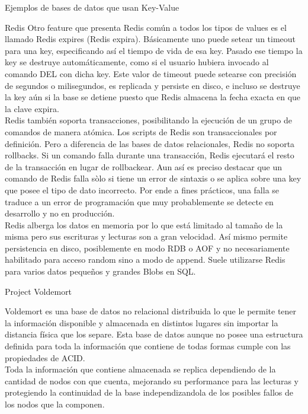 \begin{section}{Ejemplos de bases de datos que usan Key-Value}
\begin{subsection}{Redis}
Otro feature que presenta Redis común a todos los tipos de values es el llamado Redis expires (Redis expira). Básicamente uno puede setear un timeout para una key, especificando así el tiempo de vida de esa key. Pasado ese tiempo la key se destruye automáticamente, como si el usuario hubiera invocado al comando DEL con dicha key. Este valor de timeout puede setearse con precisión de segundos o milisegundos, es replicada y persiste en disco, e incluso se destruye la key aún si la base se detiene puesto que Redis almacena la fecha exacta en que la clave expira. \\

Redis también soporta transacciones, posibilitando la ejecución de un grupo de comandos de manera atómica. Los scripts de Redis son transaccionales por definición. Pero a diferencia de las bases de datos relacionales, Redis no soporta rollbacks. Si un comando falla durante una transacción, Redis ejecutará el resto de la transacción en lugar de rollbackear. Aun así es preciso destacar que un comando de Redis falla sòlo si tiene un error de sintaxis o se aplica sobre una key que posee el tipo de dato incorrecto. Por ende a fines prácticos, una falla se traduce a un error de programación que muy probablemente se detecte en desarrollo y no en producción. \\

Redis alberga los datos en memoria por lo que está limitado al tamaño de la misma pero sus escrituras y lecturas son a gran velocidad. Así mismo permite persistencia en disco, posiblemente en modo RDB o AOF y no necesariamente habilitado para acceso random sino a modo de append. Suele utilizarse Redis para varios datos pequeños y grandes Blobs en SQL. \\

\end{subsection}

\begin{subsection}{Project Voldemort}

Voldemort es una base de datos no relacional distribuida lo que le permite tener la información disponible y almacenada en distintos lugares sin importar la distancia física que los separe. Esta base de datos aunque no posee una estructura definida para toda la información que contiene de todas formas cumple con las propiedades de ACID.\\

Toda la información que contiene almacenada se replica dependiendo de la cantidad de nodos con que cuenta, mejorando su performance para las lecturas y protegiendo la continuidad de la base independizandola de los posibles fallos de los nodos que la componen. \\


\end{subsection}
\end{section}
